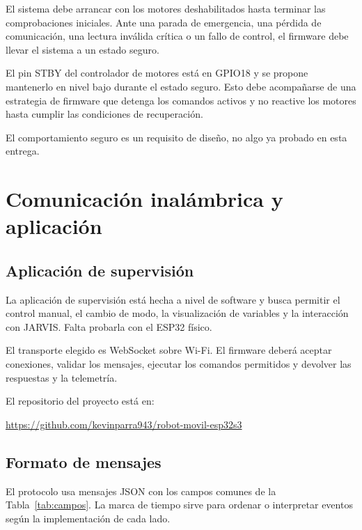 \documentclass[journal]{IEEEtran}
\begin{document}
El sistema debe arrancar con los motores deshabilitados hasta terminar las comprobaciones iniciales. Ante una parada de emergencia, una pérdida de comunicación, una lectura inválida crítica o un fallo de control, el firmware debe llevar el sistema a un estado seguro.

El pin STBY del controlador de motores está en GPIO18 y se propone mantenerlo en nivel bajo durante el estado seguro. Esto debe acompañarse de una estrategia de firmware que detenga los comandos activos y no reactive los motores hasta cumplir las condiciones de recuperación.

El comportamiento seguro es un requisito de diseño, no algo ya probado en esta entrega.


\section{Comunicación inalámbrica y aplicación}

\subsection{Aplicación de supervisión}

La aplicación de supervisión está hecha a nivel de software y busca permitir el control manual, el cambio de modo, la visualización de variables y la interacción con JARVIS. Falta probarla con el ESP32 físico.

El transporte elegido es WebSocket sobre Wi-Fi. El firmware deberá aceptar conexiones, validar los mensajes, ejecutar los comandos permitidos y devolver las respuestas y la telemetría.

El repositorio del proyecto está en:

\begin{center}
\url{https://github.com/kevinparra943/robot-movil-esp32s3}
\end{center}

\subsection{Formato de mensajes}

El protocolo usa mensajes JSON con los campos comunes de la Tabla~\ref{tab:campos}. La marca de tiempo sirve para ordenar o interpretar eventos según la implementación de cada lado.
\end{document}
